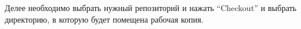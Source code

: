 \documentclass[a4paper,12pt]{article}
\begin{document}
Делее необходимо выбрать нужный репозиторий и нажать ``Checkout'' и выбрать
директорию, в которую будет помещена рабочая копия.
\begin{figure}[h!]
	\begin{minipage}[h]{0.49\linewidth}
	\end{minipage}
	\hfill
	\begin{minipage}[h]{0.49\linewidth}
	\end{minipage}
\end{figure}
\end{document}
